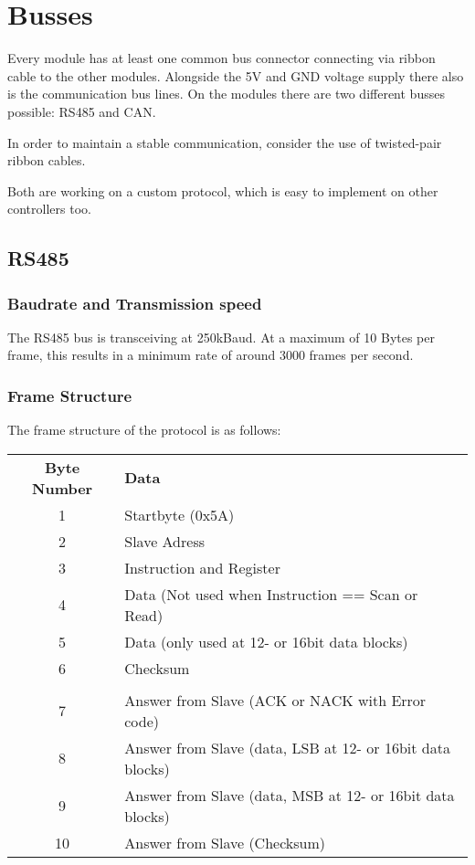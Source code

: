 \chapter{Busses}

Every module has at least one common bus connector connecting via ribbon cable to the other modules. Alongside the 5V and GND voltage supply there also is the communication bus lines. On the modules there are two different busses possible: RS485 and CAN. 

In order to maintain a stable communication, consider the use of twisted-pair ribbon cables.

Both are working on a custom protocol, which is easy to implement on other controllers too. 

\section{RS485}

\subsection{Baudrate and Transmission speed}
The RS485 bus is transceiving at 250kBaud. At a maximum of 10 Bytes per frame, this results in a minimum rate of around 3000 frames per second.

\subsection{Frame Structure}
The frame structure of the protocol is as follows:
\vspace{0.5cm}

\begin{tabular}{cl}
    \textbf{Byte Number}     & \textbf{Data}                      \\
    1               & Startbyte (0x5A)          \\
    2               & Slave Adress              \\
    3               & Instruction and Register  \\
    4               & Data (Not used when Instruction == Scan or Read) \\
    5               & Data (only used at 12- or 16bit data blocks) \\
    6               & Checksum \\
    \\
    7               & Answer from Slave (ACK or NACK with Error code) \\
    8               & Answer from Slave (data, LSB at 12- or 16bit data blocks) \\
    9               & Answer from Slave (data, MSB at 12- or 16bit data blocks) \\
    10              & Answer from Slave (Checksum)
\end{tabular}
\vspace{0.5cm}

